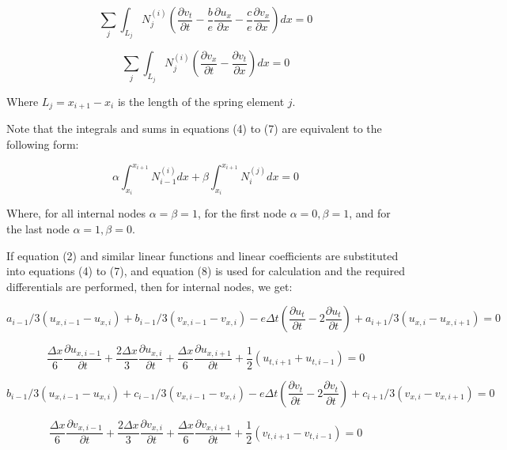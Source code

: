 \documentclass{mcmthesis}  %
\begin{document}
\begin{appendices}
\begin{equation}
\sum_j \int_{L_j} N_j^{(i)} \left(\frac{\partial v_t}{\partial t} - \frac{b}{e}\frac{\partial u_x}{\partial x} - \frac{c}{e}\frac{\partial v_x}{\partial x}\right) dx = 0
\end{equation}

\begin{equation}
\sum_j \int_{L_j} N_j^{(i)} \left(\frac{\partial v_x}{\partial t} - \frac{\partial v_t}{\partial x}\right) dx = 0
\end{equation}

Where $L_j = x_{i+1} - x_i$ is the length of the spring element $j$.

Note that the integrals and sums in equations (4) to (7) are equivalent to the following form:

\begin{equation}
\alpha \int_{x_i}^{x_{i+1}} N_{i-1}^{(i)} dx + \beta \int_{x_i}^{x_{i+1}} N_i^{(j)} dx = 0
\end{equation}

Where, for all internal nodes $\alpha = \beta = 1$, for the first node $\alpha = 0, \beta = 1$, and for the last node $\alpha = 1, \beta = 0$.

If equation (2) and similar linear functions and linear coefficients are substituted into equations (4) to (7), and equation (8) is used for calculation and the required differentials are performed, then for internal nodes, we get:

\begin{equation}
a_{i-1}/3(u_{x,i-1} - u_{x,i}) + b_{i-1}/3(v_{x,i-1} - v_{x,i}) - e\Delta t \left(\frac{\partial u_t}{\partial t} - 2\frac{\partial u_t}{\partial t}\right) + a_{i+1}/3(u_{x,i} - u_{x,i+1}) = 0
\end{equation}

\begin{equation}
\frac{\Delta x}{6} \frac{\partial u_{x,i-1}}{\partial t} + \frac{2\Delta x}{3} \frac{\partial u_{x,i}}{\partial t} + \frac{\Delta x}{6} \frac{\partial u_{x,i+1}}{\partial t} + \frac{1}{2}(u_{t,i+1} + u_{t,i-1}) = 0
\end{equation}

\begin{equation}
b_{i-1}/3(u_{x,i-1} - u_{x,i}) + c_{i-1}/3(v_{x,i-1} - v_{x,i}) - e\Delta t \left(\frac{\partial v_t}{\partial t} - 2\frac{\partial v_t}{\partial t}\right) + c_{i+1}/3(v_{x,i} - v_{x,i+1}) = 0
\end{equation}

\begin{equation}
\frac{\Delta x}{6} \frac{\partial v_{x,i-1}}{\partial t} + \frac{2\Delta x}{3} \frac{\partial v_{x,i}}{\partial t} + \frac{\Delta x}{6} \frac{\partial v_{x,i+1}}{\partial t} + \frac{1}{2}(v_{t,i+1} - v_{t,i-1}) = 0
\end{equation}


\end{appendices}
\end{document}
